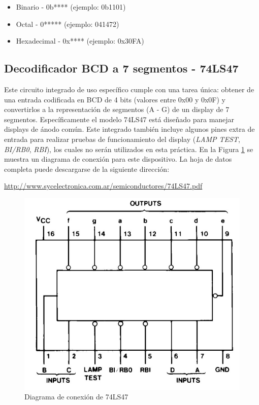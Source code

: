\begin{itemize}
    \item Binario     - 0b**** (ejemplo: 0b1101)
    \item Octal       - 0***** (ejemplo: 041472)
    \item Hexadecimal - 0x**** (ejemplo: 0x30FA)
\end{itemize}

\subsection{Decodificador BCD a 7 segmentos - 74LS47}
Este circuito integrado de uso específico cumple con una tarea única: obtener de una entrada codificada en BCD de 4 bits
(valores entre 0x00 y 0x0F) y convertirlos a la representación de segmentos (A - G) de un display de 7 segmentos. Específicamente
el modelo 74LS47 está diseñado para manejar displays de ánodo común. Este integrado también incluye algunos pines extra de entrada para
realizar pruebas de funcionamiento del display (\emph{LAMP TEST}, \emph{BI/RB0}, \emph{RBI}), los cuales no serán utilizados en esta práctica. En la Figura \ref{Fig:74LS47} se muestra
un diagrama de conexión para este dispositivo. La hoja de datos completa puede descargarse de la siguiente dirección:

\begin{center}
    \url{http://www.sycelectronica.com.ar/semiconductores/74LS47.pdf}    
\end{center}


\begin{figure}[H]
    \centering
    \includegraphics[scale=0.8]{images/74LS47.JPG}
    \caption{Diagrama de conexión de 74LS47}
    \label{Fig:74LS47}
\end{figure}



